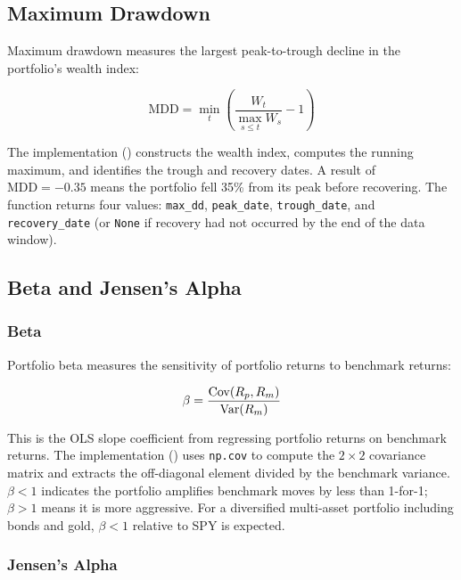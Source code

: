\subsection{Maximum Drawdown}

Maximum drawdown measures the largest peak-to-trough decline in the portfolio's wealth index:

\begin{equation}
  \text{MDD} = \min_{t} \left(\frac{W_t}{\max_{s \leq t} W_s} - 1\right)
  \label{eq:mdd}
\end{equation}

The implementation () constructs the wealth index, computes the running maximum, and identifies the trough and recovery dates. A result of $\text{MDD} = -0.35$ means the portfolio fell 35\% from its peak before recovering. The function returns four values: \texttt{max\_dd}, \texttt{peak\_date}, \texttt{trough\_date}, and \texttt{recovery\_date} (or \texttt{None} if recovery had not occurred by the end of the data window).

\subsection{Beta and Jensen's Alpha}

\subsubsection{Beta}

Portfolio beta measures the sensitivity of portfolio returns to benchmark returns:

\begin{equation}
  \beta = \frac{\operatorname{Cov}(R_p, R_m)}{\operatorname{Var}(R_m)}
  \label{eq:beta}
\end{equation}

This is the OLS slope coefficient from regressing portfolio returns on benchmark returns. The implementation () uses \texttt{np.cov} to compute the $2 \times 2$ covariance matrix and extracts the off-diagonal element divided by the benchmark variance. $\beta < 1$ indicates the portfolio amplifies benchmark moves by less than 1-for-1; $\beta > 1$ means it is more aggressive. For a diversified multi-asset portfolio including bonds and gold, $\beta < 1$ relative to SPY is expected.

\subsubsection{Jensen's Alpha}

